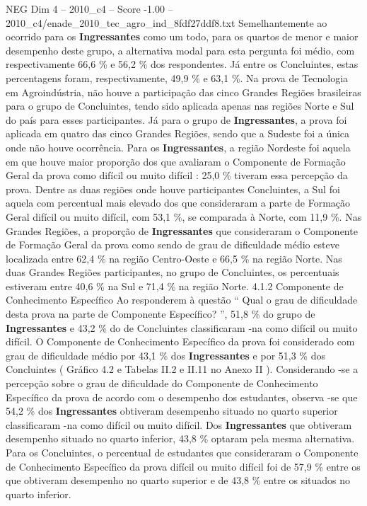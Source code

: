 \begin{textsample}{NEG Dim 4 – 2010\_c4 – Score -1.00 – 2010\_c4/enade\_2010\_tec\_agro\_ind\_8fdf27ddf8.txt}
Semelhantemente ao ocorrido para os \textbf{Ingressantes} como um todo, para os quartos de menor e maior desempenho deste grupo, a alternativa modal para esta pergunta foi médio, com respectivamente 66,6 \% e 56,2 \% dos respondentes.
Já entre os Concluintes, estas percentagens foram, respectivamente, 49,9 \% e 63,1 \%.
Na prova de Tecnologia em Agroindústria, não houve a participação das cinco Grandes Regiões brasileiras para o grupo de Concluintes, tendo sido aplicada apenas nas regiões Norte e Sul do país para esses participantes.
Já para o grupo de \textbf{Ingressantes}, a prova foi aplicada em quatro das cinco Grandes Regiões, sendo que a Sudeste foi a única onde não houve ocorrência.
Para os \textbf{Ingressantes}, a região Nordeste foi aquela em que houve maior proporção dos que avaliaram o Componente de Formação Geral da prova como difícil ou muito difícil : 25,0 \% tiveram essa percepção da prova.
Dentre as duas regiões onde houve participantes Concluintes, a Sul foi aquela com percentual mais elevado dos que consideraram a parte de Formação Geral difícil ou muito difícil, com 53,1 \%, se comparada à Norte, com 11,9 \%.
Nas Grandes Regiões, a proporção de \textbf{Ingressantes} que consideraram o Componente de Formação Geral da prova como sendo de grau de dificuldade médio esteve localizada entre 62,4 \% na região Centro-Oeste e 66,5 \% na região Norte.
Nas duas Grandes Regiões participantes, no grupo de Concluintes, os percentuais estiveram entre 40,6 \% na Sul e 71,4 \% na região Norte. 4.1.2 Componente de Conhecimento Específico Ao responderem à questão “ Qual o grau de dificuldade desta prova na parte de Componente Específico? ”, 51,8 \% do grupo de \textbf{Ingressantes} e 43,2 \% do de Concluintes classificaram -na como difícil ou muito difícil.
O Componente de Conhecimento Específico da prova foi considerado com grau de dificuldade médio por 43,1 \% dos \textbf{Ingressantes} e por 51,3 \% dos Concluintes ( Gráfico 4.2 e Tabelas II.2 e II.11 no Anexo II ).
Considerando -se a percepção sobre o grau de dificuldade do Componente de Conhecimento Específico da prova de acordo com o desempenho dos estudantes, observa -se que 54,2 \% dos \textbf{Ingressantes} obtiveram desempenho situado no quarto superior classificaram -na como difícil ou muito difícil.
Dos \textbf{Ingressantes} que obtiveram desempenho situado no quarto inferior, 43,8 \% optaram pela mesma alternativa.
Para os Concluintes, o percentual de estudantes que consideraram o Componente de Conhecimento Específico da prova difícil ou muito difícil foi de 57,9 \% entre os que obtiveram desempenho no quarto superior e de 43,8 \% entre os situados no quarto inferior.

\end{textsample}
